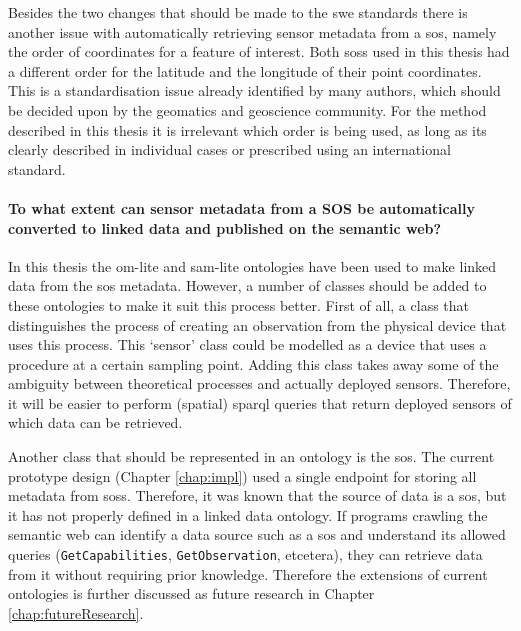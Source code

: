 Besides the two changes that should be made to the \ac{swe} standards there is another issue with automatically retrieving sensor metadata from a \ac{sos}, namely the order of coordinates for a feature of interest. Both \aclp{sos} used in this thesis had a different order for the latitude and the longitude of their point coordinates. This is a standardisation issue already identified by many authors, which should be decided upon by the geomatics and geoscience community. For the method described in this thesis it is irrelevant which order is being used, as long as its clearly described in individual cases or prescribed using an international standard.

\paragraph{To what extent can sensor metadata from a SOS be automatically converted to linked data and published on the semantic web?}\mbox{}

In this thesis the om-lite and sam-lite ontologies have been used to make linked data from the \ac{sos} metadata. However, a number of classes should be added to these ontologies to make it suit this process better. First of all, a class that distinguishes the process of creating an observation from the physical device that uses this process. This `sensor' class could be modelled as a device that uses a procedure at a certain sampling point. Adding this class takes away some of the ambiguity between theoretical processes and actually deployed sensors. Therefore, it will be easier to perform (spatial) \ac{sparql} queries that return deployed sensors of which data can be retrieved.  

Another class that should be represented in an ontology is the \acl{sos}. The current prototype design (Chapter \ref{chap:impl}) used a single endpoint for storing all metadata from \aclp{sos}. Therefore, it was known that the source of data is a \ac{sos}, but it has not properly defined in a linked data ontology. If programs crawling the semantic web can identify a data source such as a \ac{sos} and understand its allowed queries (\texttt{GetCapabilities}, \texttt{GetObservation}, etcetera), they can retrieve data from it without requiring prior knowledge. Therefore the extensions of current ontologies is further discussed as future research in Chapter \ref{chap:futureResearch}.  


